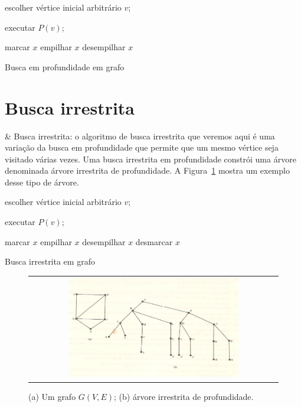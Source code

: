 \begin{algorithm}[H]
\SetAlgoLined
{}
  escolher vértice inicial arbitrário $v$;

  executar $P(v)$;

  {
    marcar $x$\;
    empilhar $x$\;
    desempilhar $x$\;
  }
  \caption{Busca em profundidade em grafo}
\end{algorithm}

\section{Busca irrestrita}

\begin{easylist}

  & Busca irrestrita: o algoritmo de busca irrestrita que veremos aqui é uma variação da busca em profundidade que permite que um mesmo vértice seja visitado várias vezes. Uma busca irrestrita em profundidade constrói uma árvore denominada árvore irrestrita de profundidade. A Figura~\ref{fig:3:1} mostra um exemplo desse tipo de árvore.

\end{easylist}


\begin{algorithm}[H]
\SetAlgoLined
{}
  escolher vértice inicial arbitrário $v$;

  executar $P(v)$;

  {
    marcar $x$\;
    empilhar $x$\;
    desempilhar $x$\;
    desmarcar $x$\;
  }
  \caption{Busca irrestrita em grafo}
\end{algorithm}


\begin{figure}[b]
  \begin{center}
    \begin{tabular}{c}
      \includegraphics[width=0.7\textwidth]{images/03/unrestricted.png}
    \end{tabular}
  \end{center}
  \caption{\label{fig:3:1} (a) Um grafo $G(V,E)$; (b) árvore irrestrita de profundidade.}
\end{figure}
  
